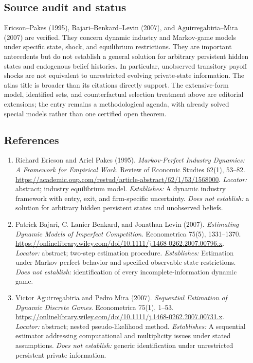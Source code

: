 \documentclass[11pt,a4paper]{article}
\begin{document}
\subsection*{Source audit and status}

Ericson--Pakes (1995), Bajari--Benkard--Levin (2007), and Aguirregabiria--Mira (2007) are verified. They concern dynamic industry and Markov-game models under specific state, shock, and equilibrium restrictions. They are important antecedents but do not establish a general solution for arbitrary persistent hidden states and endogenous belief histories. In particular, unobserved transitory payoff shocks are not equivalent to unrestricted evolving private-state information. The atlas title is broader than its citations directly support. The extensive-form model, identified sets, and counterfactual selection treatment above are editorial extensions; the entry remains a methodological agenda, with already solved special models rather than one certified open theorem.

\subsection*{References}

\begin{enumerate}

\item[S1] Richard Ericson and Ariel Pakes (1995). \emph{Markov-Perfect Industry Dynamics: A Framework for Empirical Work}. Review of Economic Studies 62(1), 53--82. \url{https://academic.oup.com/restud/article-abstract/62/1/53/1568000}. \textit{Locator:} abstract; industry equilibrium model. \textit{Establishes:} A dynamic industry framework with entry, exit, and firm-specific uncertainty. \textit{Does not establish:} a solution for arbitrary hidden persistent states and unobserved beliefs.

\item[S2] Patrick Bajari, C. Lanier Benkard, and Jonathan Levin (2007). \emph{Estimating Dynamic Models of Imperfect Competition}. Econometrica 75(5), 1331--1370. \url{https://onlinelibrary.wiley.com/doi/10.1111/j.1468-0262.2007.00796.x}. \textit{Locator:} abstract; two-step estimation procedure. \textit{Establishes:} Estimation under Markov-perfect behavior and specified observable-state restrictions. \textit{Does not establish:} identification of every incomplete-information dynamic game.

\item[S3] Victor Aguirregabiria and Pedro Mira (2007). \emph{Sequential Estimation of Dynamic Discrete Games}. Econometrica 75(1), 1--53. \url{https://onlinelibrary.wiley.com/doi/10.1111/j.1468-0262.2007.00731.x}. \textit{Locator:} abstract; nested pseudo-likelihood method. \textit{Establishes:} A sequential estimator addressing computational and multiplicity issues under stated assumptions. \textit{Does not establish:} generic identification under unrestricted persistent private information.

\end{enumerate}
\end{document}
